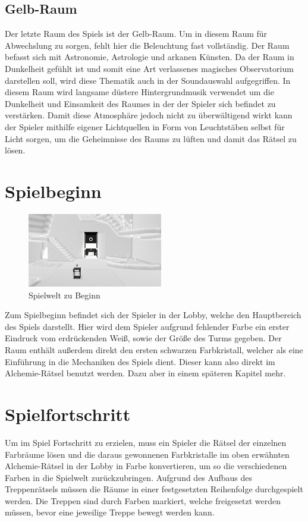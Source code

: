 \subsection{Gelb-Raum}
Der letzte Raum des Spiels ist der Gelb-Raum. Um in diesem Raum für Abwechslung zu sorgen, fehlt hier die Beleuchtung fast vollständig. Der Raum befasst sich mit Astronomie, Astrologie und arkanen Künsten. Da der Raum in Dunkelheit gefühlt ist und somit eine Art verlassenes magisches Observatorium darstellen soll, wird diese Thematik auch in der Soundauswahl aufgegriffen. In diesem Raum wird langsame düstere Hintergrundmusik verwendet um die Dunkelheit und Einsamkeit des Raumes in der der Spieler sich befindet zu verstärken. Damit diese Atmosphäre jedoch nicht zu überwältigend wirkt kann der Spieler mithilfe eigener Lichtquellen in Form von Leuchtstäben selbst für Licht sorgen, um die Geheimnisse des Raums zu lüften und damit das Rätsel zu lösen.

\newpage
\noindent
\section{Spielbeginn}
\begin{figure}
	\vspace*{-0.5cm}
	\includegraphics[width=5.9cm]{Pictures/Lobby_Start}
	\caption{Spielwelt zu Beginn}
	\vspace*{-0.5cm}
	\label{fig:spielwelt-beginn}
\end{figure}

Zum Spielbeginn befindet sich der Spieler in der Lobby, welche den Hauptbereich des Spiels darstellt. Hier wird dem Spieler aufgrund fehlender Farbe ein erster Eindruck vom erdrückenden Weiß, sowie der Größe des Turms gegeben. Der Raum enthält außerdem direkt den ersten schwarzen Farbkristall, welcher als eine Einführung in die Mechaniken des Spiels dient. Dieser kann also direkt im Alchemie-Rätsel benutzt werden. Dazu aber in einem späteren Kapitel mehr.\\

\section{Spielfortschritt}
Um im Spiel Fortschritt zu erzielen, muss ein Spieler die Rätsel der einzelnen Farbräume lösen und die daraus gewonnenen Farbkristalle im oben erwähnten Alchemie-Rätsel in der Lobby in Farbe konvertieren, um so die verschiedenen Farben in die Spielwelt zurückzubringen.
Aufgrund des Aufbaus des Treppenrätsels müssen die Räume in einer festgesetzten Reihenfolge durchgespielt werden. Die Treppen sind durch Farben markiert, welche freigesetzt werden müssen, bevor eine jeweilige Treppe bewegt werden kann.

